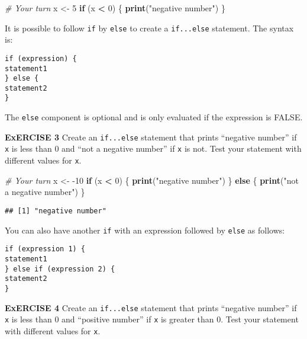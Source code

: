 \documentclass[
]{article}
\newenvironment{Shaded}{\begin{snugshade}}{\end{snugshade}}
\newcommand{\CommentTok}[1]{\textcolor[rgb]{0.56,0.35,0.01}{\textit{#1}}}
\newcommand{\ControlFlowTok}[1]{\textcolor[rgb]{0.13,0.29,0.53}{\textbf{#1}}}
\newcommand{\DecValTok}[1]{\textcolor[rgb]{0.00,0.00,0.81}{#1}}
\newcommand{\KeywordTok}[1]{\textcolor[rgb]{0.13,0.29,0.53}{\textbf{#1}}}
\newcommand{\NormalTok}[1]{#1}
\newcommand{\OperatorTok}[1]{\textcolor[rgb]{0.81,0.36,0.00}{\textbf{#1}}}
\newcommand{\StringTok}[1]{\textcolor[rgb]{0.31,0.60,0.02}{#1}}
\begin{document}
\begin{Shaded}
\begin{Highlighting}[]
\CommentTok{# Your turn}
\NormalTok{x <-}\StringTok{ }\DecValTok{5}
\ControlFlowTok{if}\NormalTok{ (x }\OperatorTok{<}\StringTok{ }\DecValTok{0}\NormalTok{) \{}
    \KeywordTok{print}\NormalTok{(}\StringTok{"negative number"}\NormalTok{)}
\NormalTok{\}}
\end{Highlighting}
\end{Shaded}

It is possible to follow \texttt{if} by \texttt{else} to create a
\texttt{if...else} statement. The syntax is:

\begin{verbatim}
if (expression) {
statement1
} else {
statement2
}
\end{verbatim}

The \texttt{else} component is optional and is only evaluated if the
expression is FALSE.

\textbf{ExERCISE 3} Create an \texttt{if...else} statement that prints
``negative number'' if \texttt{x} is less than 0 and ``not a negative
number'' if \texttt{x} is not. Test your statement with different values
for \texttt{x}.

\begin{Shaded}
\begin{Highlighting}[]
\CommentTok{# Your turn}
\NormalTok{x <-}\StringTok{ }\DecValTok{-10}
\ControlFlowTok{if}\NormalTok{ (x }\OperatorTok{<}\StringTok{ }\DecValTok{0}\NormalTok{) \{}
   \KeywordTok{print}\NormalTok{(}\StringTok{"negative number"}\NormalTok{)}
\NormalTok{\} }\ControlFlowTok{else}\NormalTok{ \{}
  \KeywordTok{print}\NormalTok{(}\StringTok{"not a negative number"}\NormalTok{)}
\NormalTok{\}}
\end{Highlighting}
\end{Shaded}

\begin{verbatim}
## [1] "negative number"
\end{verbatim}

You can also have another \texttt{if} with an expression followed by
\texttt{else} as follows:

\begin{verbatim}
if (expression 1) {
statement1
} else if (expression 2) {
statement2
}
\end{verbatim}

\textbf{ExERCISE 4} Create an \texttt{if...else} statement that prints
``negative number'' if \texttt{x} is less than 0 and ``positive number''
if \texttt{x} is greater than 0. Test your statement with different
values for \texttt{x}.
\end{document}
